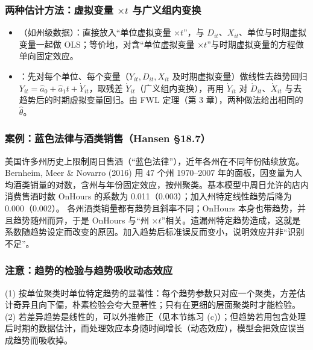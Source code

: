 \subsubsection{两种估计方法：虚拟变量 \texorpdfstring{$\times t$}{x t} 与广义组内变换}

\begin{itemize}
  \item {}（如州级数据）：直接放入“单位虚拟变量 $\times t$”，与 $D_{it}$、$X_{it}$、单位与时期虚拟变量一起做 OLS；等价地，对含“单位虚拟变量 $\times t$”与时期虚拟变量的方程做单向固定效应。
  \item {}：先对每个单位、每个变量（$Y_{it},D_{it},X_{it}$ 及时期虚拟变量）做线性去趋势回归 $Y_{it}=\hat a_0+\hat a_1t+\dot Y_{it}$，取残差 $\dot Y_{it}$（广义组内变换），再用 $\dot Y_{it}$ 对 $\dot D_{it}$、$\dot X_{it}$ 与去趋势后的时期虚拟变量回归。由 FWL 定理（第 3 章），两种做法给出相同的 $\hat\theta$。
\end{itemize}

\subsubsection{案例：蓝色法律与酒类销售（Hansen \S18.7）}

\begin{exmp}[放宽周日售酒限制是否增加酒类消费]\label{ex:U15b-bluelaw}
美国许多州历史上限制周日售酒（“蓝色法律”），近年各州在不同年份陆续放宽。Bernheim, Meer \& Novarro (2016) 用 47 个州 1970--2007 年的面板，因变量为人均酒类销量的对数，含州与年份固定效应，按州聚类。基本模型中周日允许的店内消费售酒时数 OnHours 的系数为 0.011（0.003）；加入州特定线性趋势后降为 0.000（0.002）。
\solution 各州酒类销量都有趋势且斜率不同；OnHours 本身也带趋势，并且趋势随州而异，于是 OnHours 与“州 $\times t$”相关。遗漏州特定趋势造成，这就是系数随趋势设定而改变的原因。加入趋势后标准误反而变小，说明效应并非“识别不足”。
\end{exmp}

\subsubsection{注意：趋势的检验与趋势吸收动态效应}

\begin{note}[单位特定趋势的两个陷阱]
(1) 按单位聚类时单位特定趋势的显著性：每个趋势参数只对应一个聚类，方差估计奇异且向下偏，朴素检验会夸大显著性；只有在更细的层面聚类时才能检验。(2) 若差异趋势是线性的，可以外推修正（见本节练习 (c)）；但趋势若用包含处理后时期的数据估计，而处理效应本身随时间增长（动态效应），模型会把效应误当成趋势而吸收掉。
\end{note}

